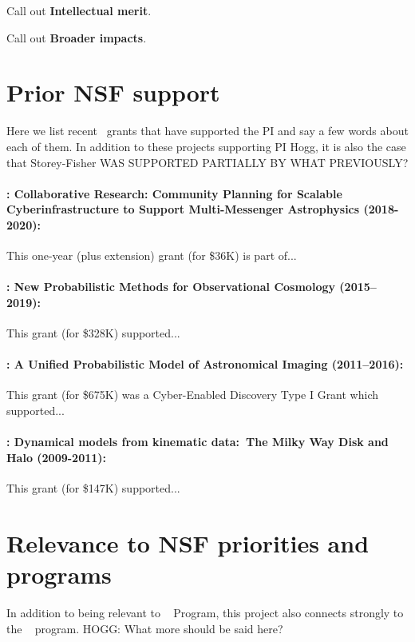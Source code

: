 \documentclass[12pt, fullpage, letterpaper]{article}
\begin{document}
Call out \textbf{Intellectual merit}.

Call out \textbf{Broader impacts}.

\section{Prior NSF support}

Here we list recent \NSF\ grants that have supported the PI and say a
few words about each of them.
In addition to these projects supporting PI Hogg, it is also the case
that Storey-Fisher WAS SUPPORTED PARTIALLY BY WHAT PREVIOUSLY?

\paragraph{: Collaborative Research: Community Planning for Scalable Cyberinfrastructure to Support Multi-Messenger Astrophysics (2018-2020):}
This one-year (plus extension) grant (for \$36K) is part of...

\paragraph{: New Probabilistic Methods for Observational Cosmology (2015--2019):}
This grant (for \$328K) supported...

\paragraph{: A Unified Probabilistic Model of Astronomical Imaging (2011--2016):}
This grant (for \$675K) was a Cyber-Enabled Discovery Type I Grant which supported...

\paragraph{: Dynamical models from kinematic data:\ The Milky Way Disk and Halo (2009-2011):}
This grant (for \$147K) supported...

\section{Relevance to NSF priorities and programs}

In addition to being relevant to \NSF\  Program, this project also
connects strongly to the \NSF\  program.
HOGG: What more should be said here?
\end{document}
